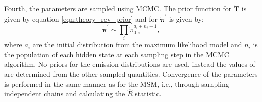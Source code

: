 Fourth, the parameters are sampled using MCMC. The prior function for $\widetilde{\mathbf{T}}$ is given by equation \ref{eqn:theory_rev_prior} and for $\widetilde{\bm{\pi}}^{\prime}$ is given by: 
\begin{equation}
    \widetilde{\bm{\pi}}^{\prime} \sim \prod_{i} \widetilde{\pi}_{0, i}^{a_{i}+n_{i}-1},
\end{equation}
where $a_{i}$ are the initial distribution from the maximum likelihood model and $n_{i}$ is the population of each hidden state at each sampling step in the MCMC algorithm. No priors for the emission distributions are used, instead the values of are determined from the other sampled quantities. Convergence of the parameters is performed in the same manner as for the MSM, i.e., through sampling independent chains and calculating the $\hat{R}$ statistic. 

